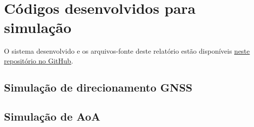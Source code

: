 \chapter{Códigos desenvolvidos para simulação}

O sistema desenvolvido e os arquivos-fonte deste relatório estão disponíveis \href{https://github.com/HeckRodSav/TG}{\underline{neste repositório no GitHub}}.

\section{Simulação de direcionamento GNSS}



\section{Simulação de AoA}













